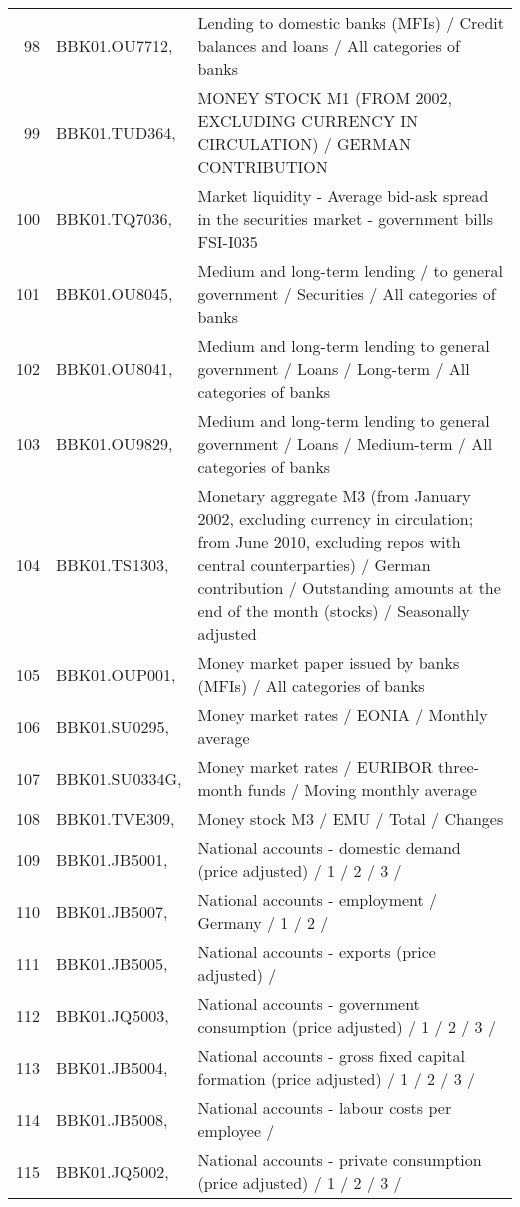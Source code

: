 \begin{table}[ht]
\begin{tabular}{rll}
  98 & BBK01.OU7712, & Lending to domestic banks (MFIs) / Credit balances and loans / All categories of banks \\ 
  99 & BBK01.TUD364, & MONEY STOCK M1 (FROM 2002, EXCLUDING CURRENCY IN CIRCULATION) / GERMAN CONTRIBUTION \\ 
  100 & BBK01.TQ7036, & Market liquidity - Average bid-ask spread in the securities market - government bills                          FSI-I035 \\ 
  101 & BBK01.OU8045, & Medium and long-term lending / to general government / Securities / All categories of banks \\ 
  102 & BBK01.OU8041, & Medium and long-term lending to general government / Loans / Long-term / All categories of banks \\ 
  103 & BBK01.OU9829, & Medium and long-term lending to general government / Loans / Medium-term / All categories of banks \\ 
  104 & BBK01.TS1303, & Monetary aggregate M3 (from January 2002, excluding currency in circulation; from June 2010, excluding repos with central counterparties) / German contribution / Outstanding amounts at the end of the month (stocks) / Seasonally adjusted \\ 
  105 & BBK01.OUP001, & Money market paper issued by banks (MFIs) / All categories of banks \\ 
  106 & BBK01.SU0295, & Money market rates / EONIA / Monthly average \\ 
  107 & BBK01.SU0334G, & Money market rates / EURIBOR three-month funds / Moving monthly average \\ 
  108 & BBK01.TVE309, & Money stock M3 / EMU / Total / Changes \\ 
  109 & BBK01.JB5001, & National accounts - domestic demand (price adjusted) / 1 / 2 / 3 / \\ 
  110 & BBK01.JB5007, & National accounts - employment / Germany / 1 / 2 / \\ 
  111 & BBK01.JB5005, & National accounts - exports (price adjusted) / \\ 
  112 & BBK01.JQ5003, & National accounts - government consumption (price adjusted) / 1 / 2 / 3 / \\ 
  113 & BBK01.JB5004, & National accounts - gross fixed capital formation (price adjusted) / 1 / 2 / 3 / \\ 
  114 & BBK01.JB5008, & National accounts - labour costs per employee / \\ 
  115 & BBK01.JQ5002, & National accounts - private consumption (price adjusted) / 1 / 2 / 3 / \\ 

\end{tabular}
\end{table}
